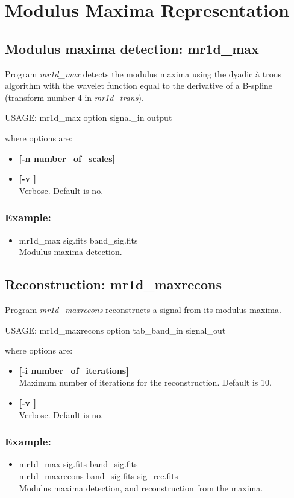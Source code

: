\section{Modulus Maxima Representation}
\subsection{Modulus maxima detection: mr1d\_max}
Program {\em mr1d\_max} detects the modulus maxima using the dyadic
  \`a trous algorithm  with the wavelet function equal to the derivative
of a B-spline (transform number 4 in {\em mr1d\_trans}).
{\bf
\begin{center}
 USAGE: mr1d\_max option signal\_in  output
\end{center}}
where options are:
\begin{itemize}
\item {\bf [-n number\_of\_scales]} 
\item {\bf [-v ]} \\
Verbose. Default is no.
\end{itemize}
\subsubsection*{Example:}
\begin{itemize}
\item mr1d\_max sig.fits band\_sig.fits   \\
Modulus maxima detection.
\end{itemize}


\subsection{Reconstruction: mr1d\_maxrecons}
Program {\em mr1d\_maxrecons} reconstructs a signal from its modulus maxima.
{\bf
\begin{center}
 USAGE: mr1d\_maxrecons option tab\_band\_in signal\_out 
\end{center}}
where options are:
\begin{itemize} 
 \item {\bf [-i number\_of\_iterations]}  \\
Maximum number of iterations for the reconstruction. Default is 10.
\item {\bf [-v ]} \\
Verbose. Default is no.
\end{itemize}
\subsubsection*{Example:}
\begin{itemize}
\item mr1d\_max sig.fits band\_sig.fits   \\
      mr1d\_maxrecons band\_sig.fits sig\_rec.fits \\
Modulus maxima detection, and reconstruction from the maxima.
\end{itemize}

